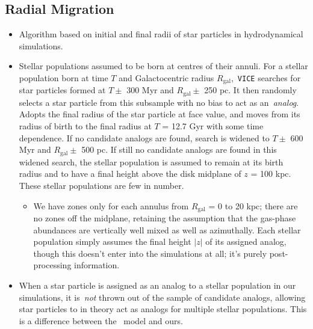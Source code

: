 \documentclass[a4paper, fleqn, usenatbib, useAMS]{mnras}
\begin{document}
\subsection{Radial Migration} 
\label{sec:methods:migration} 
\begin{itemize} 
	\item Algorithm based on initial and final radii of star particles in 
	hydrodynamical simulations. 

	\item Stellar populations assumed to be born at centres of their annuli. 
	For a stellar population born at time $T$ and Galactocentric radius 
	$R_\text{gal}$,~\texttt{VICE} searches for star particles formed at 
	$T \pm$ 300 Myr and $R_\text{gal} \pm$ 250 pc. It then randomly selects 
	a star particle from this subsample with no bias to act as 
	an~\textit{analog}. Adopts the final radius of the star particle at face 
	value, and moves from its radius of birth to the final radius at $T$ = 
	12.7 Gyr with some time dependence. If no candidate analogs are found, 
	search is widened to $T \pm$ 600 Myr and $R_\text{gal} \pm$ 500 pc. If 
	still no candidate analogs are found in this widened search, the stellar 
	population is assumed to remain at its birth radius {\color{red} and to 
	have a final height above the disk midplane of $z$ = 100 kpc.} These 
	stellar populations are few in number. 
	\begin{itemize} 
		\item We have zones only for each annulus from $R_\text{gal}$ = 0 to 
		20 kpc; there are no zones off the midplane, retaining the assumption 
		that the gas-phase abundances are vertically well mixed as well as 
		azimuthally. Each stellar population simply assumes the final height 
		$\left|z\right|$ of its assigned analog, though this doesn't enter 
		into the simulations at all; it's purely post-processing information. 
	\end{itemize} 

	\item When a star particle is assigned as an analog to a stellar 
	population in our simulations, it is~\textit{not} thrown out of the sample 
	of candidate analogs, allowing star particles to in theory act as analogs 
	for multiple stellar populations. This is a difference between 
	the~\citet{Minchev2013} model and ours. 


\end{itemize}
\end{document}
